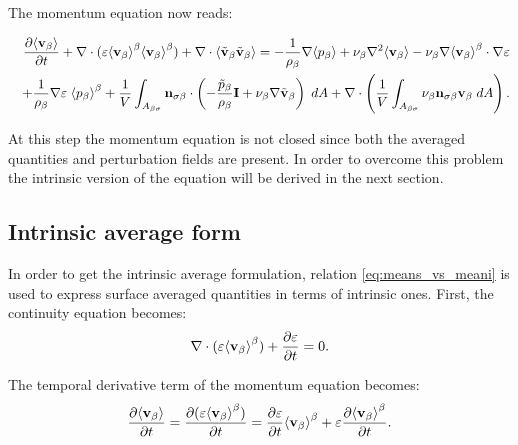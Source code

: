 
\noindent The momentum equation now reads:

\begin{eqnarray}
&&\dfrac{\partial {\left< \textbf{v}_{\beta}\right>}}{\partial t} + \nabla \cdot (\varepsilon {\left< \textbf{v}_{\beta}\right>}^{\beta}{\left< \textbf{v}_{\beta} \right>}^{\beta}) + \nabla \cdot {\left< \tilde{\textbf{v}}_{\beta}\tilde{\textbf{v}}_{\beta}\right>} = -\dfrac{1}{\rho_{\beta}} \nabla {\left< p_{\beta}\right>} + \nu_{\beta}\nabla^2 {\left< \textbf{v}_{\beta} \right>}  - \nu_{\beta}  \nabla {\left< \textbf{v}_{\beta}\right>}^{\beta} \cdot \nabla \varepsilon  \nonumber \\
&&+\dfrac{1}{\rho_{\beta}}\nabla\varepsilon \; {\left< p_{\beta} \right>}^{\beta} +\dfrac{1}{V} \displaystyle\int_{A_{\beta \sigma}}\mathbf{n}_{\sigma \beta}   \cdot  \left( -\dfrac{\tilde{p}_{\beta}}{\rho_{\beta}} \mathbf{I} + \nu_{\beta} \nabla \tilde{\textbf{v}}_{\beta}  \right) \;dA + \nabla \cdot \left( \dfrac{1}{V} \int_{A_{\beta \sigma}}  \nu_{\beta}  \mathbf{n}_{\sigma \beta} \textbf{v}_{\beta} \;dA \right).  \nonumber \\
\label{eq:NS_2}
\end{eqnarray}

At this step the momentum equation is not closed since both the averaged quantities and perturbation fields are present.
In order to overcome this problem the intrinsic version of the equation will be derived in the next section.

\subsection{Intrinsic average form}
In order to get the intrinsic average formulation, relation \eqref{eq:means_vs_meani} is used to express surface averaged quantities in terms of intrinsic ones. First, the continuity equation becomes:
$$
\nabla \cdot (\varepsilon{\left< \textbf{v}_{\beta}\right>}^{\beta} ) + \dfrac{\partial \varepsilon}{\partial t}= 0.
$$

\noindent The temporal derivative term of the momentum equation becomes:
$$
\dfrac{\partial {\left< \textbf{v}_{\beta}\right>}}{\partial t} = \dfrac{\partial (\varepsilon{\left< \textbf{v}_{\beta}\right>}^{\beta})}{\partial t} = \dfrac{\partial \varepsilon}{\partial t}{\left< \textbf{v}_{\beta} \right>}^{\beta} + \varepsilon \dfrac{\partial {\left< \textbf{v}_{\beta}\right>}^{\beta}}{\partial t}.
$$

